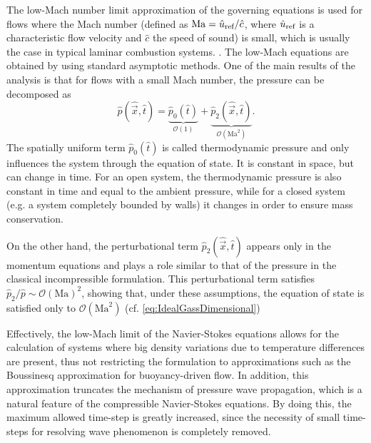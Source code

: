The low-Mach number limit approximation of the governing equations is used for flows where the Mach number (defined as $\text{Ma} = \hat u_{\text{ref}}/\hat c$, where $\hat u_{\text{ref}}$ is a characteristic flow velocity and $\hat{c}$ the speed of sound) is small, which is usually the case in typical laminar combustion systems. \citep{dobbinsFullyImplicitCompact2010}.
The low-Mach equations are obtained by using standard asymptotic methods. One of the main results of the analysis is that for flows with a small Mach number, the pressure can be decomposed as
\begin{equation}
	\hat p(\hat {\vec{x}}, \hat t) = \underbrace{\hat p_0(\hat t)}_{\mathcal{O}(1)} + \underbrace{\hat p_2(\hat{\vec{x}},\hat t)}_{\mathcal{O}(\text{Ma}^2)} .
\end{equation}
The spatially uniform term $\hat p_0(\hat t)$ is called thermodynamic pressure and only influences the system through the equation of state. It is constant in space, but can change in time.  For an open system, the thermodynamic pressure is also constant in time and equal to the ambient pressure, while for a closed system (e.g. a system completely bounded by walls) it changes in order to ensure mass conservation. 

On the other hand, the perturbational term $\hat p_2(\hat{\vec{x}},\hat t)$ appears only in the momentum equations and plays a role similar to that of the pressure in the classical incompressible formulation. This perturbational term satisfies $\hat p_2/\hat p \sim \mathcal{O}(\text{Ma})^2$, \citep{dobbinsFullyImplicitCompact2010,nonakaConservativeThermodynamicallyConsistent2018} showing that, under these assumptions, the equation of state is satisfied only to $\mathcal{O}(\text{Ma}^2)$ (cf.  \cref{eq:IdealGassDimensional})

Effectively, the low-Mach limit of the Navier-Stokes equations allows for the calculation of systems where big density variations due to temperature differences are present, thus not restricting the formulation to approximations such as the Boussinesq approximation for buoyancy-driven flow. In addition, this approximation truncates the mechanism of pressure wave propagation, which is a natural feature of the compressible Navier-Stokes equations. By doing this, the maximum allowed time-step is greatly increased, since the necessity of small time-steps for resolving wave phenomenon is completely removed.


